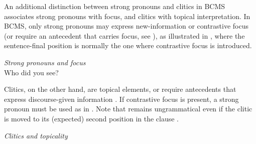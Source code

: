 \documentclass[output=paper,colorlinks,citecolor=brown]{langscibook}
\begin{document}
An additional distinction between strong pronouns and clitics in BCMS associates strong pronouns with focus, and clitics with topical interpretation. In BCMS, only strong pronouns may express new-information or contrastive focus (or require an antecedent that carries focus, see \citealt{despic11,jovovic22}), as illustrated in , where the sentence-final position is normally the one where contrastive focus is introduced.  
	
	\ea \label{pronounsfocus} \textit{Strong pronouns and focus} \\
	Who did you see?
\z \z

\noindent Clitics, on the other hand, are topical elements, or require antecedents that express discourse-given information \citep{jovovic22}. If contrastive focus is present, a strong pronoun must be used as in . Note that  remains ungrammatical even if the clitic is moved to its (expected) second position in the clause .

\ea \label{cliticstopic} \textit{Clitics and topicality }
\label{boundvariablefocus} 
\label{boundvariablefocus2}
\z \z
\end{document}
